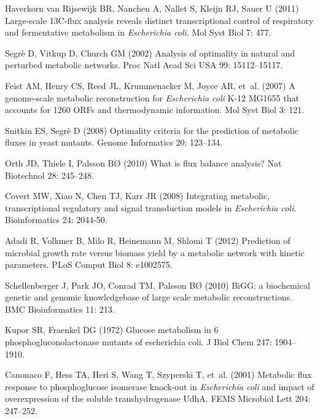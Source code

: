 \documentclass[12pt]{article}
\begin{document}
\begin{thebibliography}{10}
{Haverkorn van Rijsewijk} BR, Nanchen A, Nallet S, Kleijn RJ, Sauer U (2011)
  Large-scale {13C-flux} analysis reveals distinct transcriptional control of
  respiratory and fermentative metabolism in \emph{Escherichia coli}.
\newblock Mol Syst Biol 7: 477.

Segr\`e D, Vitkup D, Church GM (2002) Analysis of optimality in natural and
  perturbed metabolic networks.
\newblock Proc Natl Acad Sci USA 99: 15112--15117.

Feist AM, Henry CS, Reed JL, Krummenacker M, Joyce AR, et~al. (2007) A
  genome-scale metabolic reconstruction for \emph{Escherichia coli} {K-12
  MG1655} that accounts for 1260 {ORFs} and thermodynamic information.
\newblock Mol Syst Biol 3: 121.

Snitkin ES, Segr\`e D (2008) Optimality criteria for the prediction of
  metabolic fluxes in yeast mutants.
\newblock Genome Informatics 20: 123--134.

Orth JD, Thiele I, Palsson B{\O} (2010) What is flux balance analysis?
\newblock Nat Biotechnol 28: 245--248.

Covert MW, Xiao N, Chen TJ, Karr JR (2008) Integrating metabolic,
  transcriptional regulatory and signal transduction models in
  \emph{Escherichia coli}.
\newblock Bioinformatics 24: 2044-50.

Adadi R, Volkmer B, Milo R, Heinemann M, Shlomi T (2012) Prediction of
  microbial growth rate versus biomass yield by a metabolic network with
  kinetic parameters.
\newblock PLoS Comput Biol 8: e1002575.

Schellenberger J, Park JO, Conrad TM, Palsson B{\O} (2010) {BiGG:} a
  biochemical genetic and genomic knowledgebase of large scale metabolic
  reconstructions.
\newblock BMC Bioinformatics 11: 213.

Kupor SR, Fraenkel DG (1972) Glucose metabolism in 6 phosphogluconolactonase
  mutants of escherichia coli.
\newblock J Biol Chem 247: 1904--1910.

Canonaco F, Hess TA, Heri S, Wang T, Szyperski T, et~al. (2001) Metabolic flux
  response to phosphoglucose isomerase knock-out in \emph{Escherichia coli} and
  impact of overexpression of the soluble transhydrogenase {UdhA}.
\newblock FEMS Microbiol Lett 204: 247--252.


\end{thebibliography}
\end{document}

